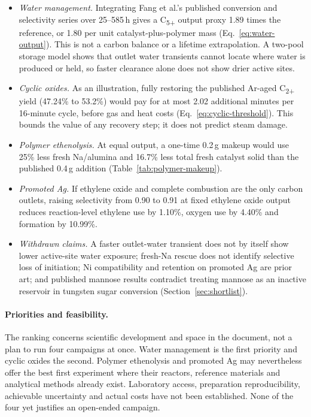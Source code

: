 \begin{itemize}
 \item \emph{Water management.} Integrating Fang et al.'s published conversion and selectivity series over 25--585\,h gives a C\textsubscript{5+} output proxy 1.89 times the reference, or 1.80 per unit catalyst-plus-polymer mass (Eq.~\ref{eq:water-output}). This is not a carbon balance or a lifetime extrapolation. A two-pool storage model shows that outlet water transients cannot locate where water is produced or held, so faster clearance alone does not show drier active sites.
 \item \emph{Cyclic oxides.} As an illustration, fully restoring the published Ar-aged C\textsubscript{2+} yield (47.24\% to 53.2\%) would pay for at most 2.02 additional minutes per 16-minute cycle, before gas and heat costs (Eq.~\ref{eq:cyclic-threshold}). This bounds the value of any recovery step; it does not predict steam damage.
 \item \emph{Polymer ethenolysis.} At equal output, a one-time 0.2\,g makeup would use 25\% less fresh Na/alumina and 16.7\% less total fresh catalyst solid than the published 0.4\,g addition (Table~\ref{tab:polymer-makeup}).
 \item \emph{Promoted Ag.} If ethylene oxide and complete combustion are the only carbon outlets, raising selectivity from 0.90 to 0.91 at fixed ethylene oxide output reduces reaction-level ethylene use by 1.10\%, oxygen use by 4.40\% and \COtwo{} formation by 10.99\%.
 \item \emph{Withdrawn claims.} A faster outlet-water transient does not by itself show lower active-site water exposure; fresh-Na rescue does not identify selective loss of initiation; Ni compatibility and retention on promoted Ag are prior art; and published mannose results contradict treating mannose as an inactive reservoir in tungsten sugar conversion (Section~\ref{sec:shortlist}).
\end{itemize}

\paragraph{Priorities and feasibility.}
The ranking concerns scientific development and space in the document, not a plan to run four campaigns at once. Water management is the first priority and cyclic oxides the second. Polymer ethenolysis and promoted Ag may nevertheless offer the best first experiment where their reactors, reference materials and analytical methods already exist. Laboratory access, preparation reproducibility, achievable uncertainty and actual costs have not been established. None of the four yet justifies an open-ended campaign.

